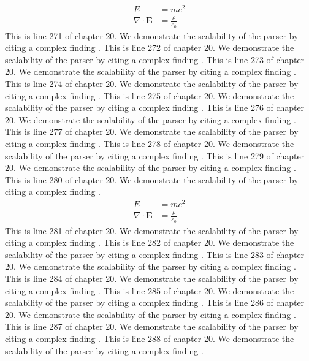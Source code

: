 \begin{align*}
  E &= mc^2 \\
  \nabla \cdot \mathbf{E} &= \frac{\rho}{\varepsilon_0}
\end{align*}
This is line 271 of chapter 20. We demonstrate the scalability of the parser by citing a complex finding \cite{ref20_271}.
This is line 272 of chapter 20. We demonstrate the scalability of the parser by citing a complex finding \cite{ref20_272}.
This is line 273 of chapter 20. We demonstrate the scalability of the parser by citing a complex finding \cite{ref20_273}.
This is line 274 of chapter 20. We demonstrate the scalability of the parser by citing a complex finding \cite{ref20_274}.
This is line 275 of chapter 20. We demonstrate the scalability of the parser by citing a complex finding \cite{ref20_275}.
This is line 276 of chapter 20. We demonstrate the scalability of the parser by citing a complex finding \cite{ref20_276}.
This is line 277 of chapter 20. We demonstrate the scalability of the parser by citing a complex finding \cite{ref20_277}.
This is line 278 of chapter 20. We demonstrate the scalability of the parser by citing a complex finding \cite{ref20_278}.
This is line 279 of chapter 20. We demonstrate the scalability of the parser by citing a complex finding \cite{ref20_279}.
This is line 280 of chapter 20. We demonstrate the scalability of the parser by citing a complex finding \cite{ref20_280}.
\begin{align*}
  E &= mc^2 \\
  \nabla \cdot \mathbf{E} &= \frac{\rho}{\varepsilon_0}
\end{align*}
This is line 281 of chapter 20. We demonstrate the scalability of the parser by citing a complex finding \cite{ref20_281}.
This is line 282 of chapter 20. We demonstrate the scalability of the parser by citing a complex finding \cite{ref20_282}.
This is line 283 of chapter 20. We demonstrate the scalability of the parser by citing a complex finding \cite{ref20_283}.
This is line 284 of chapter 20. We demonstrate the scalability of the parser by citing a complex finding \cite{ref20_284}.
This is line 285 of chapter 20. We demonstrate the scalability of the parser by citing a complex finding \cite{ref20_285}.
This is line 286 of chapter 20. We demonstrate the scalability of the parser by citing a complex finding \cite{ref20_286}.
This is line 287 of chapter 20. We demonstrate the scalability of the parser by citing a complex finding \cite{ref20_287}.
This is line 288 of chapter 20. We demonstrate the scalability of the parser by citing a complex finding \cite{ref20_288}.
